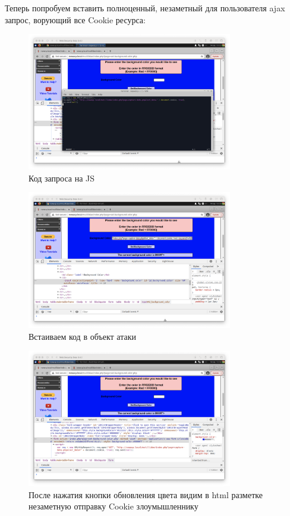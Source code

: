 \documentclass[a4paper]{article}
\begin{document}
  Теперь попробуем вставить полноценный, незаметный для пользователя ajax запрос,
  ворующий все Cookie ресурса:

  \begin{figure}[H]
    \centering
    \includegraphics[width=0.8\textwidth]{step_00016}
    \caption{Код запроса на JS}
  \end{figure}

  \begin{figure}[H]
    \centering
    \includegraphics[width=0.8\textwidth]{step_00017}
    \caption{Встаиваем код в объект атаки}
  \end{figure}

  \begin{figure}[H]
    \centering
    \includegraphics[width=0.8\textwidth]{step_00018}
    \caption{После нажатия кнопки обновления цвета видим в html разметке незаметную отправку Cookie злоумышленнику}
  \end{figure}
\end{document}
